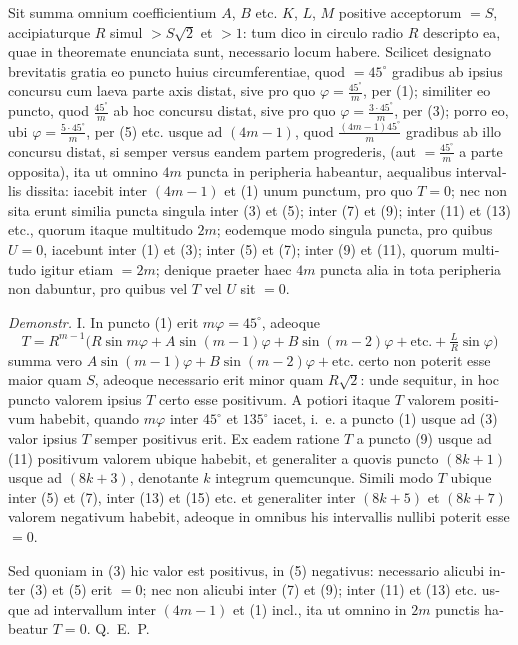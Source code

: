 \documentclass[12pt,a4paper]{article}
\begin{document}
\begin{otherlanguage}{latin}
Sit summa omnium coefficientium $A$, $B$ etc. $K$, $L$, $M$ positive acceptorum $=S$, accipiaturque $R$ simul $>S\sqrt{2}$ et $>1$: tum dico in circulo radio $R$ descripto ea, quae in theoremate enunciata sunt, necessario locum habere. Scilicet designato brevitatis gratia eo puncto huius circumferentiae, quod $=45^{\circ}$ gradibus ab ipsius concursu cum laeva parte axis distat, sive pro quo $\varphi=\frac{45^{\circ}}{m}$, per (1); similiter eo puncto, quod $\frac{45^{\circ}}{m}$ ab hoc concursu distat, sive pro quo $\varphi=\frac{3\cdot45^{\circ}}{m}$, per (3); porro eo, ubi $\varphi=\frac{5\cdot45^{\circ}}{m}$, per (5) etc. usque ad $(4m-1)$, quod $\frac{(4m-1)45^{\circ}}{m}$ gradibus ab illo concursu distat, si semper versus eandem partem progrederis, (aut $=\frac{45^{\circ}}{m}$ a parte opposita), ita ut omnino $4m$ puncta in peripheria habeantur, aequalibus intervallis dissita: iacebit inter $(4m-1)$ et (1) unum punctum, pro quo $T=0$; nec non sita erunt similia puncta singula inter (3) et (5); inter (7) et (9); inter (11) et (13) etc., quorum itaque multitudo $2m$; eodemque modo singula puncta, pro quibus $U=0$, iacebunt inter (1) et (3); inter (5) et (7); inter (9) et (11), quorum multitudo igitur etiam $=2m$; denique praeter haec $4m$ puncta alia in tota peripheria non dabuntur, pro quibus vel $T$ vel $U$ sit $=0$.

\textit{Demonstr.} I. In puncto (1) erit $m\varphi=45^{\circ}$, adeoque
\[T=R^{m-1}\bigl(R\sin m\varphi+A\sin(m-1)\varphi+B\sin(m-2)\varphi+\text{etc.}+\tfrac{L}{R}\sin\varphi\bigr)\]
summa vero $A\sin(m-1)\varphi+B\sin(m-2)\varphi+\text{etc.}$ certo non poterit esse maior quam $S$, adeoque necessario erit minor quam $R\sqrt{2}$: unde sequitur, in hoc puncto valorem ipsius $T$ certo esse positivum. A potiori itaque $T$ valorem positivum habebit, quando $m\varphi$ inter $45^{\circ}$ et $135^{\circ}$ iacet, i.~e. a puncto (1) usque ad (3) valor ipsius $T$ semper positivus erit. Ex eadem ratione $T$ a puncto (9) usque ad (11) positivum valorem ubique habebit, et generaliter a quovis puncto $(8k+1)$ usque ad $(8k+3)$, denotante $k$ integrum quemcunque. Simili modo $T$ ubique inter (5) et (7), inter (13) et (15) etc. et generaliter inter $(8k+5)$ et $(8k+7)$ valorem negativum habebit, adeoque in omnibus his intervallis nullibi poterit esse $=0$.

Sed quoniam in (3) hic valor est positivus, in (5) negativus: necessario alicubi inter (3) et (5) erit $=0$; nec non alicubi inter (7) et (9); inter (11) et (13) etc. usque ad intervallum inter $(4m-1)$ et (1) incl., ita ut omnino in $2m$ punctis habeatur $T=0$. Q.~E.~P.


\end{otherlanguage}
\end{document}

